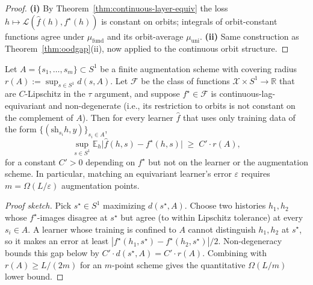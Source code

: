 \begin{proof}
\textbf{(i)} By Theorem~\ref{thm:continuous-layer-equiv} the loss
$h \mapsto \mathcal{L}(\hat{f}(h), f^\star(h))$ is constant on orbits; integrals of
orbit-constant functions agree under $\mu_\mathrm{fund}$ and its
orbit-average $\mu_\mathrm{uni}$.
\textbf{(ii)} Same construction as Theorem~\ref{thm:oodgap}(ii), now
applied to the continuous orbit structure.
\end{proof}

\begin{theorem}
\label{thm:aug-lower-bound}
Let $A = \{s_1, \dots, s_m\} \subset S^1$ be a finite augmentation
scheme with covering radius $r(A) := \sup_{s \in S^1} d(s, A)$.  Let
$\mathcal{F}$ be the class of functions $\mathcal{X} \times S^1 \to \mathbb{R}$ that
are $C$-Lipschitz in the $\tau$ argument, and suppose $f^\star \in \mathcal{F}$
is continuous-lag-equivariant and non-degenerate (i.e., its restriction
to orbits is not constant on the complement of $A$).  Then for every
learner $\hat{f}$ that uses only training data of the form
$\{(\mathrm{sh}_{s_i} h, y)\}_{s_i \in A}$,
\[
  \sup_{s \in S^1} \mathbb{E}_h \bigl|\hat{f}(h, s) - f^\star(h, s)\bigr|
  \;\ge\; C' \cdot r(A),
\]
for a constant $C' > 0$ depending on $f^\star$ but not on the learner
or the augmentation scheme.  In particular, matching an equivariant
learner's error $\varepsilon$ requires $m = \Omega(L/\varepsilon)$
augmentation points.
\end{theorem}

\begin{proof}[Proof sketch]
Pick $s^\star \in S^1$ maximizing $d(s^\star, A)$.  Choose two
histories $h_1, h_2$ whose $f^\star$-images disagree at $s^\star$ but
agree (to within Lipschitz tolerance) at every $s_i \in A$.  A learner
whose training is confined to $A$ cannot distinguish $h_1, h_2$ at
$s^\star$, so it makes an error at least $|f^\star(h_1, s^\star) -
f^\star(h_2, s^\star)|/2$.  Non-degeneracy bounds this gap below by
$C' \cdot d(s^\star, A) = C' \cdot r(A)$.  Combining with
$r(A) \ge L/(2m)$ for an $m$-point scheme gives the quantitative
$\Omega(L/m)$ lower bound.
\end{proof}

